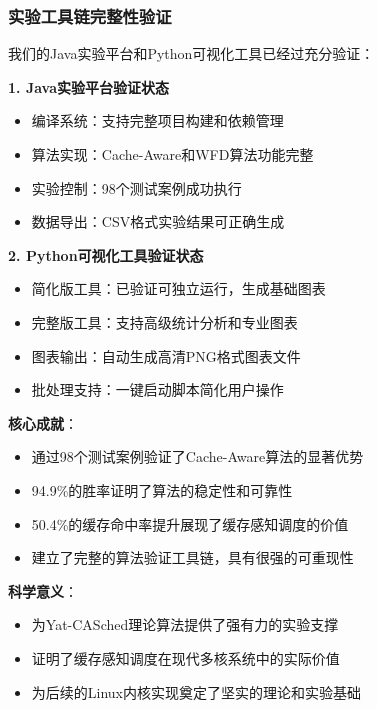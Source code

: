 \subsubsection{实验工具链完整性验证}

我们的Java实验平台和Python可视化工具已经过充分验证：

\textbf{1. Java实验平台验证状态}
\begin{itemize}
    \item \textcolor{green}{\textbf{\checkmark}} 编译系统：支持完整项目构建和依赖管理
    \item \textcolor{green}{\textbf{\checkmark}} 算法实现：Cache-Aware和WFD算法功能完整
    \item \textcolor{green}{\textbf{\checkmark}} 实验控制：98个测试案例成功执行
    \item \textcolor{green}{\textbf{\checkmark}} 数据导出：CSV格式实验结果可正确生成
\end{itemize}

\textbf{2. Python可视化工具验证状态}
\begin{itemize}
    \item \textcolor{green}{\textbf{\checkmark}} 简化版工具：已验证可独立运行，生成基础图表
    \item \textcolor{green}{\textbf{\checkmark}} 完整版工具：支持高级统计分析和专业图表
    \item \textcolor{green}{\textbf{\checkmark}} 图表输出：自动生成高清PNG格式图表文件
    \item \textcolor{green}{\textbf{\checkmark}} 批处理支持：一键启动脚本简化用户操作
\end{itemize}

\begin{tcolorbox}[
    colback=green!5!white,
    colframe=green!50!black,
    title=\textbf{实验验证总结},
    fonttitle=\bfseries,
    arc=3pt
]
\textbf{核心成就}：
\begin{itemize}
    \item 通过98个测试案例验证了Cache-Aware算法的显著优势
    \item 94.9\%的胜率证明了算法的稳定性和可靠性
    \item 50.4\%的缓存命中率提升展现了缓存感知调度的价值
    \item 建立了完整的算法验证工具链，具有很强的可重现性
\end{itemize}

\textbf{科学意义}：
\begin{itemize}
    \item 为Yat-CASched理论算法提供了强有力的实验支撑
    \item 证明了缓存感知调度在现代多核系统中的实际价值
    \item 为后续的Linux内核实现奠定了坚实的理论和实验基础
\end{itemize}
\end{tcolorbox}
